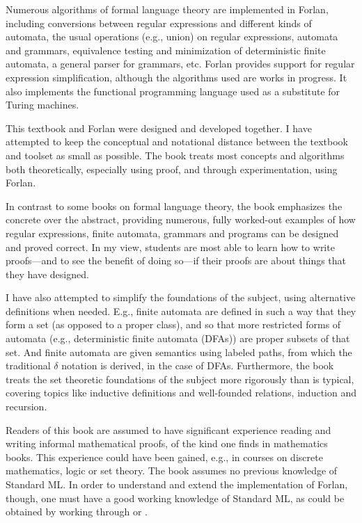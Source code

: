 Numerous algorithms of formal language theory are implemented in
Forlan, including conversions between regular expressions and
different kinds of automata, the usual operations (e.g., union) on
regular expressions, automata and grammars, equivalence testing and
minimization of deterministic finite automata, a general parser for
grammars, etc.  Forlan provides support for regular expression
simplification, although the algorithms used are works in progress.
It also implements the functional programming language used as a
substitute for Turing machines.

This textbook and Forlan were designed and developed together.  I have
attempted to keep the conceptual and notational distance between the
textbook and toolset as small as possible.  The book treats most
concepts and algorithms both theoretically, especially using proof,
and through experimentation, using Forlan.

In contrast to some books on formal language theory, the book
emphasizes the concrete over the abstract, providing numerous, fully
worked-out examples of how regular expressions, finite automata,
grammars and programs can be designed and proved correct.  In my view,
students are most able to learn how to write proofs---and to see the
benefit of doing so---if their proofs are about things that they have
designed.

I have also attempted to simplify the foundations of the subject,
using alternative definitions when needed. E.g., finite automata are
defined in such a way that they form a set (as opposed to a proper
class), and so that more restricted forms of automata (e.g.,
deterministic finite automata (DFAs)) are proper subsets of that
set. And finite automata are given semantics using labeled paths, from
which the traditional $\delta$ notation is derived, in the case of
DFAs. Furthermore, the book treats the set theoretic foundations of
the subject more rigorously than is typical, covering topics
like inductive definitions and well-founded relations, induction
and recursion.

Readers of this book are assumed to have significant experience
reading and writing informal mathematical proofs, of the kind one
finds in mathematics books.  This experience could have been gained,
e.g., in courses on discrete mathematics, logic or set theory.  The
book assumes no previous knowledge of Standard ML.  In order to
understand and extend the implementation of Forlan, though, one must
have a good working knowledge of Standard ML, as could be obtained by
working through \cite{Paulson96} or \cite{Ullman98}.

